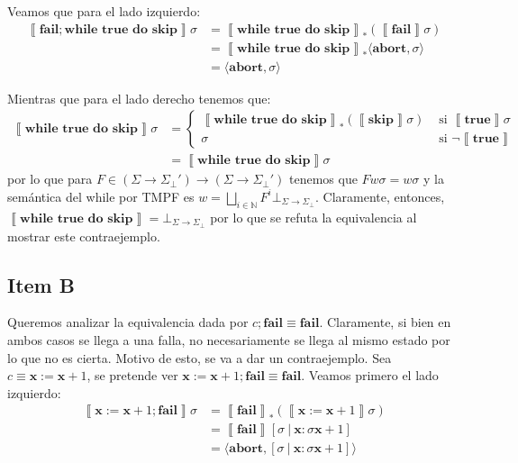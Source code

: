 \documentclass{article}
\newcommand{\sem}[1]{\left\llbracket #1\right\rrbracket}
\newcommand{\N}{\mathbb{N}}
\newcommand{\x}{\textbf{x}}
\newcommand{\supr}{\bigsqcup\limits}
\newcommand{\cdom}{\Sigma \to \Sigma_\bot}
\newcommand{\cdomf}{\Sigma \to \Sigma_\bot'}
\newcommand{\cfbot}{\bot_{\cdom}}
\newcommand{\ctrue}{\textbf{true}}
\newcommand{\cskip}{\textbf{skip}}
\newcommand{\cwhile}[2]{\textbf{while }#1\textbf{ do }#2}
\newcommand{\cfail}{\textbf{fail}}
\newcommand{\cabort}[1]{\langle\textbf{abort}, #1\rangle}
\begin{document}
Veamos que para el lado izquierdo:
\begin{equation*}
  \begin{aligned}
    \sem{\cfail; \cwhile{\ctrue}{\cskip}} \sigma &= \sem{\cwhile{\ctrue}{\cskip}}_* (\sem{\cfail}\sigma) \\ 
                                                 &= \sem{\cwhile{\ctrue}{\cskip}}_* \cabort{\sigma} \\ 
                                                 &= \cabort{\sigma}
  \end{aligned}
\end{equation*}

Mientras que para el lado derecho tenemos que:
\begin{equation*}
  \begin{aligned}
    \sem{\cwhile{\ctrue}{\cskip}} \sigma &= \begin{cases}
      \sem{\cwhile{\ctrue}{\cskip}}_* (\sem{\cskip}\sigma) &\text{ si }\sem{\ctrue}\sigma \\ 
      \sigma &\text{ si }\neg\sem{\ctrue}
    \end{cases} \\ 
                                         &= \sem{\cwhile{\ctrue}{\cskip}} \sigma
  \end{aligned}
\end{equation*}
por lo que para $F \in (\cdomf) \to (\cdomf)$ tenemos que $F w \sigma = w \sigma$ y la semántica del while por TMPF es $w = \supr_{i \in \N} F^i \cfbot$.
Claramente, entonces, $\sem{\cwhile{\ctrue}{\cskip}} = \cfbot$ por lo que se refuta la equivalencia al mostrar este contraejemplo.

\subsection*{Item B}
Queremos analizar la equivalencia dada por $c; \cfail \equiv \cfail$.
Claramente, si bien en ambos casos se llega a una falla, no necesariamente se llega al mismo estado por lo que no es cierta.
Motivo de esto, se va a dar un contraejemplo.
Sea $c \equiv \x := \x+1$, se pretende ver $\x := \x+1; \cfail \equiv \cfail$.
Veamos primero el lado izquierdo:
\begin{equation*}
  \begin{aligned}
    \sem{\x := \x+1; \cfail} \sigma &= \sem{\cfail}_* (\sem{\x := \x+1}\sigma) \\ 
                                    &= \sem{\cfail} [\sigma\ |\ \x : \sigma\x+1] \\ 
                                    &= \cabort{[\sigma\ |\ \x : \sigma\x+1]}
  \end{aligned}
\end{equation*}
\end{document}
